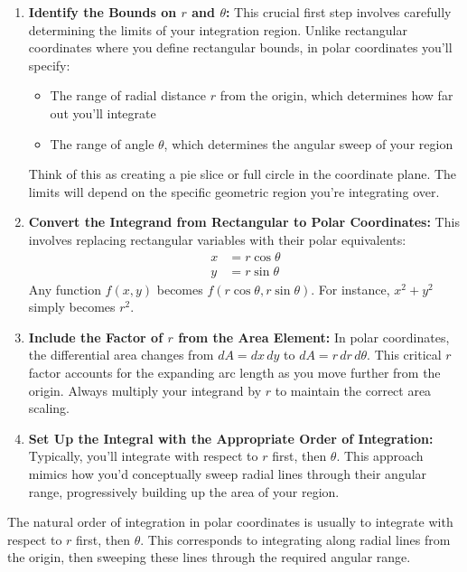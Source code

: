 \begin{enumerate}
   \item \textbf{Identify the Bounds on $r$ and $\theta$:} 
    This crucial first step involves carefully determining the limits of your integration region. Unlike rectangular coordinates where you define rectangular bounds, in polar coordinates you'll specify:
    \begin{itemize}
        \item The range of radial distance $r$ from the origin, which determines how far out you'll integrate
        \item The range of angle $\theta$, which determines the angular sweep of your region
    \end{itemize}
    Think of this as creating a pie slice or full circle in the coordinate plane. The limits will depend on the specific geometric region you're integrating over.

   \item \textbf{Convert the Integrand from Rectangular to Polar Coordinates:}
    This involves replacing rectangular variables with their polar equivalents:
    \begin{align*}
    x &= r\cos\theta \\
    y &= r\sin\theta
    \end{align*}
    Any function $f(x,y)$ becomes $f(r\cos\theta, r\sin\theta)$. For instance, $x^2 + y^2$ simply becomes $r^2$.

   \item \textbf{Include the Factor of $r$ from the Area Element:}
    In polar coordinates, the differential area changes from $dA = dx\,dy$ to $dA = r\,dr\,d\theta$. This critical $r$ factor accounts for the expanding arc length as you move further from the origin. Always multiply your integrand by $r$ to maintain the correct area scaling.

   \item \textbf{Set Up the Integral with the Appropriate Order of Integration:}
    Typically, you'll integrate with respect to $r$ first, then $\theta$. This approach mimics how you'd conceptually sweep radial lines through their angular range, progressively building up the area of your region.
\end{enumerate}

\noindent The natural order of integration in polar coordinates is usually to integrate with respect to $r$ first, then $\theta$. This corresponds to integrating along radial lines from the origin, then sweeping these lines through the required angular range. \\

